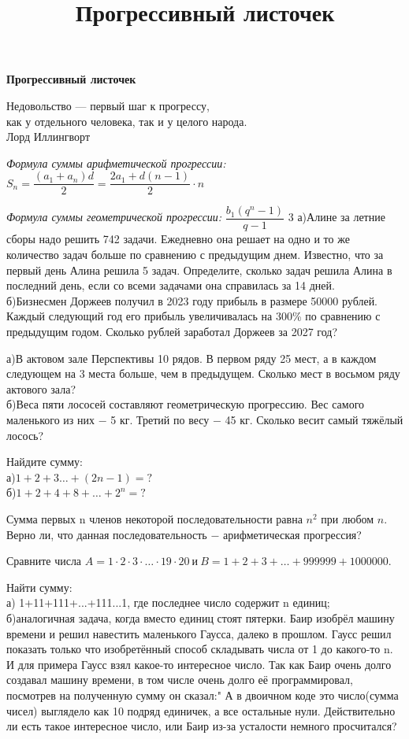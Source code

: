 \centerline{\bf \Huge Прогрессивный листочек}
\title{Прогрессивный листочек}

\begin{flushright}
    \scriptsize Недовольство — первый шаг к прогрессу, \\как у отдельного человека, так и у целого народа.\\Лорд Иллингворт
\end{flushright}

\vspace{\baselineskip}

\textit{Формула суммы арифметической прогрессии:} $S_n=\dfrac{(a_1 + a_n)d}{2} = \dfrac{2a_1 + d(n-1)}{2}\cdot n$

\textit{Формула суммы геометрической прогрессии:} $\dfrac{b_1 (q^n-1)}{q-1}$
3
 а)Алине за летние сборы надо решить  742 задачи. Ежедневно она решает на одно и то же количество задач больше по сравнению с предыдущим днем. Известно, что за первый день Алина решила 5 задач. Определите, сколько задач решила Алина в последний день, если со всеми задачами она справилась за 14 дней.\\
б)Бизнесмен Доржеев получил в 2023 году прибыль в размере 50000 рублей. Каждый следующий год его прибыль увеличивалась на 300\% по сравнению с предыдущим годом. Сколько рублей заработал Доржеев за 2027 год?

а)В актовом зале Перспективы 10 рядов. В первом ряду 25 мест, а в каждом следующем на 3 места больше, чем в предыдущем. Сколько мест в восьмом ряду актового зала?\\
б)Веса пяти лососей составляют геометрическую прогрессию. Вес самого маленького из них $-$ 5 кг. Третий по весу $-$ 45 кг. Сколько весит самый тяжёлый лосось?

Найдите сумму:\\
а)$1+2+3\dots+(2n-1)=?$\\
б)$1+2+4+8+\dots+2^n=?$

Сумма первых n членов некоторой последовательности равна $n^2$ при любом $n$. Верно ли, что данная последовательность $-$ арифметическая прогрессия?

Сравните числа $A = 1\cdot2\cdot 3\cdot \dots \cdot 19 \cdot 20 \ \text{и} \ B = 1 + 2 + 3 + \dots +999999 + 1000000$.

Найти сумму:\\
а) 1+11+111+...+111...1, где последнее число содержит n единиц; \\
б)аналогичная задача, когда вместо единиц стоят пятерки.
Баир изобрёл машину времени и решил навестить маленького Гаусса, далеко в прошлом. Гаусс решил показать только что изобретённый способ складывать числа от 1 до какого-то n. И для примера
\newpage
\noindent
Гаусс взял какое-то интересное число. Так как Баир очень долго создавал машину времени, в том числе очень долго её программировал, посмотрев на полученную сумму он сказал:" А в двоичном коде это число(сумма чисел) выглядело как 10 подряд единичек, а все остальные нули. Действительно ли есть такое интересное число, или Баир из-за усталости немного просчитался?

